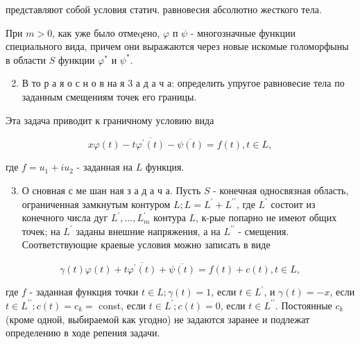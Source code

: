 \documentclass[10pt]{article}
\begin{document}
представляют собой условия статич. равновесия абсолютно жесткого тела.



При $m>0$, как уже было отмеqено, $\varphi$ п $\psi$ - многозначные функции специального вида, причем они выражаются через новые искомые голоморфыны в области $S$ функции $\varphi^{*}$ и $\psi^{*}$.



\begin{enumerate}

  \setcounter{enumi}{1}

  \item В то р а я о с н о в на я 3 а д а ч а: определить упругое равновесие тела по заданным смещениям точек его границы.

\end{enumerate}



Эта задача приводит к граничному условию вида



\[

x \varphi(t)-t \overline{\varphi^{\prime}(t)}-\overline{\psi(t)}=f(t), t \in L,

\]



где $f=u_{1}+i u_{2}$ - заданная на $L$ функция.



\begin{enumerate}

  \setcounter{enumi}{2}

  \item О сновная с ме шан ная з а д а ч а. Пусть $S$ - конечная односвязная область, ограниченная замкнутым контуром $L ; L=L^{\prime}+L^{\prime \prime}$, где $L^{\prime}$ состоит из конечного числа дуг $L^{\prime}, \ldots, L_{m}^{\prime}$ контура $L$, к-рые попарно не имеют общих точек; на $L^{\prime}$ заданы внешние напряжения, а на $L^{\prime \prime}$ - смещения. Соответствующие краевые условия можно записать в виде

\end{enumerate}



\[

\gamma(t) \varphi(t)+t \overline{\varphi^{\prime}(t)}+\overline{\psi(t)}=f(t)+c(t), t \in L,

\]



где $f$ - заданная функция точки $t \in L ; \gamma(t)=1$, если $t \in L^{\prime}$, и $\gamma(t)=-x$, если $t \in L^{\prime \prime} ; c(t)=c_{k}=$ const, если $t \in L^{\prime} ; c(t)=0$, если $t \in L^{\prime \prime}$. Постоянные $c_{k}$ (кроме одной, выбираемой как угодно) не задаются заранее и подлежат определению в ходе репения задачи.
\end{document}
